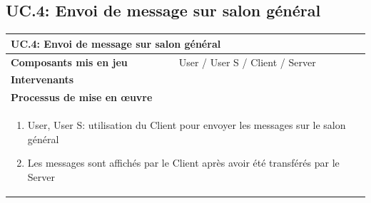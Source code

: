 \documentclass[a4paper,11pt,french]{article}
\begin{document}
\subsection{UC.4: Envoi de message sur salon général}
\begin{center}
	\vspace*{0.7cm}
	\begin{tabularx}{16cm}{|l|X|}
	\hline
	\multicolumn{2}{|l|}{\textbf{UC.4: Envoi de message sur salon général}}\\
	\hline
	\textbf{Composants mis en jeu} & User / User S / Client / Server \\
	\hline
	\textbf{Intervenants} & \\
	\hline
	\multicolumn{2}{|l|}{\textbf{Processus de mise en \oe uvre}}\\
	\hline
	\multicolumn{2}{|p{15cm}|}{\begin{enumerate}\item User, User S: utilisation du Client pour envoyer les messages sur le salon général \item Les messages sont affichés par le Client après avoir été transférés par le Server\end{enumerate}}\\
	\hline
	\end{tabularx}
\end{center}

\end{document}
